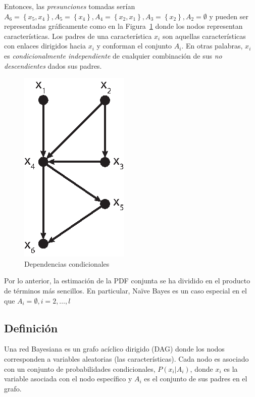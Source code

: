 \documentclass{article}
\begin{document}
Entonces, las \emph{presunciones} tomadas serían $A_6 = \left \{  x_5, x_4 \right \}, A_5 = \left \{  x_4 \right \}, A_4 = \left \{  x_2, x_1 \right \}, A_3 = \left \{  x_2 \right \}, A_2 = \emptyset$ y pueden ser representadas gráficamente como en la Figura~\ref{fig:dependencias-condicionales} donde los nodos representan características.
Los padres de una característica $x_i$ son aquellas características con enlaces dirigidos hacia $x_i$ y conforman el conjunto $A_i$.
En otras palabras, $x_i$ es \emph{condicionalmente independiente} de cualquier combinación de sus \emph{no descendientes} dados sus padres.
\begin{figure}[h]
	\centering
	\includegraphics[]{resources/images/dependencias-condicionales}
	\caption{Dependencias condicionales}
	\label{fig:dependencias-condicionales}
\end{figure}

Por lo anterior, la estimación de la PDF conjunta se ha dividido en el producto de términos más sencillos.
En particular, Naïve Bayes es un caso especial en el que $A_i = \emptyset, i = 2, \ldots, l$

\subsection{Definición} 
\label{sec:definición}
Una red Bayesiana es un grafo acíclico dirigido (DAG) donde los nodos corresponden a variables aleatorias (las características).
Cada nodo es asociado con un conjunto de probabilidades condicionales, $P(x_i|A_i)$, donde $x_i$ es la variable asociada con el nodo específico y $A_i$ es el conjunto de sus padres en el grafo.
\end{document}
